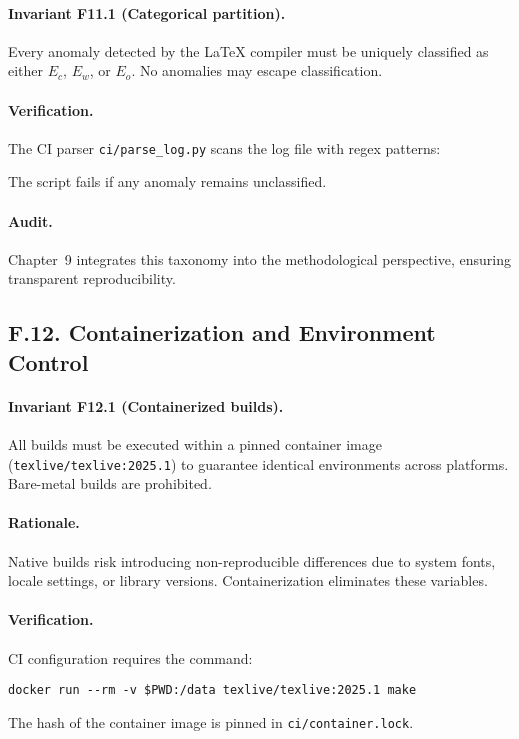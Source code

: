 \paragraph{Invariant F11.1 (Categorical partition).} Every anomaly detected by the LaTeX compiler must be uniquely classified as either $E_c$, $E_w$, or $E_o$. No anomalies may escape classification.

\paragraph{Verification.} The CI parser \texttt{ci/parse\_log.py} scans the log file with regex patterns:
The script fails if any anomaly remains unclassified.

\paragraph{Audit.} Chapter~9 integrates this taxonomy into the methodological perspective, ensuring transparent reproducibility.

\subsection*{F.12. Containerization and Environment Control}

\paragraph{Invariant F12.1 (Containerized builds).} All builds must be executed within a pinned container image (\texttt{texlive/texlive:2025.1}) to guarantee identical environments across platforms. Bare-metal builds are prohibited.

\paragraph{Rationale.} Native builds risk introducing non-reproducible differences due to system fonts, locale settings, or library versions. Containerization eliminates these variables.

\paragraph{Verification.} CI configuration requires the command:
\begin{verbatim}
docker run --rm -v $PWD:/data texlive/texlive:2025.1 make
\end{verbatim}
The hash of the container image is pinned in \texttt{ci/container.lock}.

